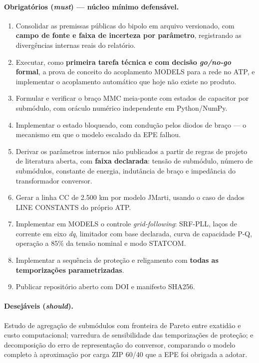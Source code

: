 \documentclass[12pt,a4paper]{article}
\begin{document}
\paragraph{Obrigatórios (\emph{must}) --- núcleo mínimo defensável.}
\begin{enumerate}[label=\textbf{OE\arabic*.}, leftmargin=1.6cm]
  \item Consolidar as premissas públicas do bipolo em arquivo versionado, com \textbf{campo de fonte
        e faixa de incerteza por parâmetro}, registrando as divergências internas reais do relatório.
  \item Executar, como \textbf{primeira tarefa técnica e com decisão \emph{go/no-go} formal}, a prova
        de conceito do acoplamento MODELS para a rede no ATP, e implementar o acoplamento automático
        que hoje não existe no produto.
  \item Formular e verificar o braço MMC meia-ponte com estados de capacitor por submódulo, com
        oráculo numérico independente em Python/NumPy.
  \item Implementar o estado bloqueado, com condução pelos diodos de braço --- o mecanismo em que o
        modelo escalado da EPE falhou.
  \item Derivar os parâmetros internos não publicados a partir de regras de projeto de literatura
        aberta, com \textbf{faixa declarada}: tensão de submódulo, número de submódulos, constante de
        energia, indutância de braço e impedância do transformador conversor.
  \item Gerar a linha CC de 2.500 km por modelo JMarti, usando o caso de dados LINE CONSTANTS do
        próprio ATP.
  \item Implementar em MODELS o controle \emph{grid-following}: SRF-PLL, laços de corrente em eixo
        \emph{dq}, limitador com base declarada, curva de capacidade P-Q, operação a 85\% da tensão
        nominal e modo STATCOM.
  \item Implementar a sequência de proteção e religamento com \textbf{todas as temporizações
        parametrizadas}.
  \item Publicar repositório aberto com DOI e manifesto SHA256.
\end{enumerate}

\paragraph{Desejáveis (\emph{should}).}
Estudo de agregação de submódulos com fronteira de Pareto entre exatidão e custo computacional;
varredura de sensibilidade das temporizações de proteção; e decomposição do erro de representação do
conversor, comparando o modelo completo à aproximação por carga ZIP 60/40 que a EPE foi obrigada a
adotar.
\end{document}
